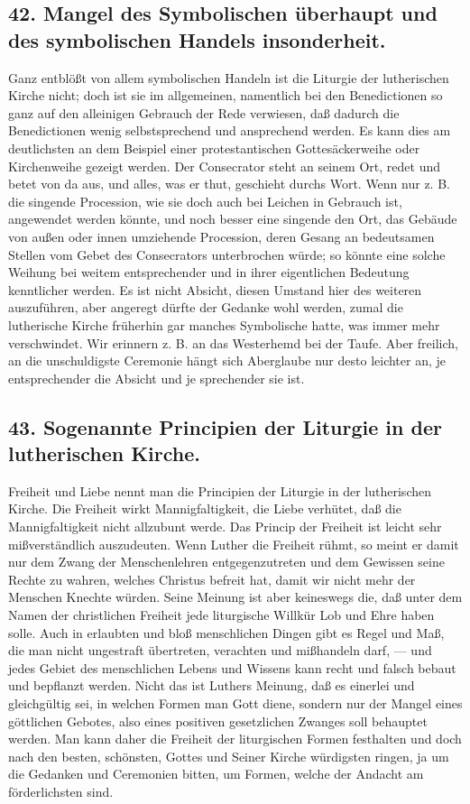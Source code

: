 \subsection*{42. Mangel des Symbolischen überhaupt und des symbolischen Handels insonderheit.}

Ganz entblößt von allem symbolischen Handeln ist die Liturgie der lutherischen Kirche nicht; doch ist sie im allgemeinen, namentlich bei den Benedictionen so ganz auf den alleinigen Gebrauch der Rede verwiesen, daß dadurch die Benedictionen wenig selbstsprechend und ansprechend werden. Es kann dies
am deutlichsten an dem Beispiel einer protestantischen Gottesäckerweihe oder Kirchenweihe gezeigt werden. Der Consecrator steht an seinem Ort, redet und betet von da aus, und alles, was er thut, geschieht durchs Wort. Wenn nur z. B. die singende Procession, wie sie doch auch bei Leichen in Gebrauch ist, angewendet werden könnte, und noch besser eine singende den Ort, das Gebäude von außen oder innen umziehende Procession, deren Gesang an bedeutsamen Stellen vom Gebet des Consecrators unterbrochen würde; so könnte eine solche Weihung bei weitem entsprechender und in ihrer eigentlichen Bedeutung kenntlicher werden. Es ist nicht Absicht, diesen Umstand hier des weiteren auszuführen, aber angeregt dürfte der Gedanke wohl werden, zumal die lutherische Kirche früherhin gar manches Symbolische hatte, was immer mehr verschwindet. Wir erinnern z. B. an das Westerhemd bei der Taufe. Aber freilich, an die unschuldigste Ceremonie hängt sich Aberglaube nur desto leichter an, je entsprechender die Absicht und je sprechender sie ist.

\subsection*{43. Sogenannte Principien der Liturgie in der lutherischen Kirche.}

Freiheit und Liebe nennt man die Principien der Liturgie in der lutherischen Kirche. Die Freiheit wirkt Mannigfaltigkeit, die Liebe verhütet, daß die Mannigfaltigkeit nicht allzubunt werde. Das Princip der Freiheit ist leicht
sehr mißverständlich auszudeuten. Wenn Luther die Freiheit rühmt, so meint er damit nur dem Zwang der Menschenlehren entgegenzutreten und dem Gewissen seine Rechte zu wahren, welches Christus befreit hat, damit wir nicht mehr der Menschen Knechte würden. Seine Meinung ist aber keineswegs die, daß unter dem Namen der christlichen Freiheit jede liturgische Willkür Lob und Ehre haben solle. Auch in erlaubten und bloß menschlichen Dingen gibt es Regel und Maß, die man nicht ungestraft übertreten, verachten und mißhandeln darf, — und jedes Gebiet des menschlichen Lebens und Wissens kann recht und falsch bebaut und bepflanzt werden. Nicht das ist Luthers Meinung, daß es einerlei und gleichgültig sei, in welchen Formen man Gott diene, sondern nur der Mangel eines göttlichen Gebotes, also eines positiven gesetzlichen Zwanges soll behauptet werden. Man kann daher die Freiheit der liturgischen Formen festhalten und doch nach den besten, schönsten, Gottes und Seiner Kirche würdigsten ringen, ja um die Gedanken und Ceremonien bitten, um Formen, welche der Andacht am förderlichsten sind.

